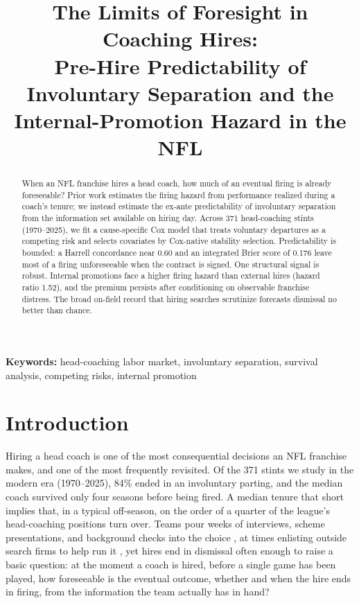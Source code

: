 \documentclass[12pt,USenglish]{article}
\begin{document}
\title{The Limits of Foresight in Coaching Hires:\\
Pre-Hire Predictability of Involuntary Separation and the\\
Internal-Promotion Hazard in the NFL}

\author{}
\date{}

\maketitle

\begin{abstract}
\noindent When an NFL franchise hires a head coach, how much of an eventual firing is already foreseeable? Prior work estimates the firing hazard from performance realized during a coach's tenure; we instead estimate the ex-ante predictability of involuntary separation from the information set available on hiring day. Across 371 head-coaching stints (1970--2025), we fit a cause-specific Cox model that treats voluntary departures as a competing risk and selects covariates by Cox-native stability selection. Predictability is bounded: a Harrell concordance near 0.60 and an integrated Brier score of 0.176 leave most of a firing unforeseeable when the contract is signed. One structural signal is robust. Internal promotions face a higher firing hazard than external hires (hazard ratio 1.52), and the premium persists after conditioning on observable franchise distress. The broad on-field record that hiring searches scrutinize forecasts dismissal no better than chance.
\end{abstract}

\medskip
\noindent\textbf{Keywords:} head-coaching labor market, involuntary separation, survival analysis, competing risks, internal promotion

\newpage

\section{Introduction}

Hiring a head coach is one of the most consequential decisions an NFL franchise makes, and one of the most frequently revisited. Of the 371 stints we study in the modern era (1970--2025), 84\% ended in an involuntary parting, and the median coach survived only four seasons before being fired. A median tenure that short implies that, in a typical off-season, on the order of a quarter of the league's head-coaching positions turn over. Teams pour weeks of interviews, scheme presentations, and background checks into the choice \citep{perez2025, brandt2026}, at times enlisting outside search firms to help run it \citep{schefter2016}, yet hires end in dismissal often enough to raise a basic question: at the moment a coach is hired, before a single game has been played, how foreseeable is the eventual outcome, whether and when the hire ends in firing, from the information the team actually has in hand?
\end{document}
